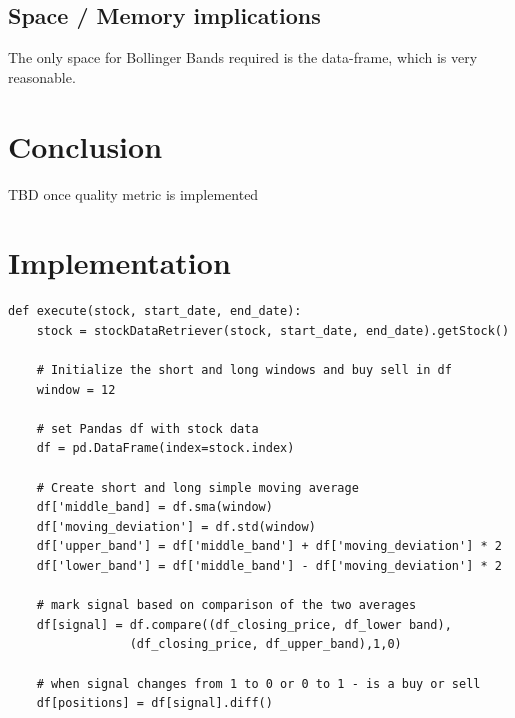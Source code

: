 \documentclass[letterpaper,11pt]{article}
\begin{document}
\subsection*{Space / Memory implications}
The only space for Bollinger Bands required is the data-frame, which is very reasonable.

\section*{Conclusion}
TBD once quality metric is implemented

\section*{Implementation}
\begin{verbatim}
def execute(stock, start_date, end_date):
    stock = stockDataRetriever(stock, start_date, end_date).getStock()

    # Initialize the short and long windows and buy sell in df
    window = 12

    # set Pandas df with stock data
    df = pd.DataFrame(index=stock.index)

    # Create short and long simple moving average
    df['middle_band] = df.sma(window)
    df['moving_deviation'] = df.std(window)
    df['upper_band'] = df['middle_band'] + df['moving_deviation'] * 2
    df['lower_band'] = df['middle_band'] - df['moving_deviation'] * 2

    # mark signal based on comparison of the two averages
    df[signal] = df.compare((df_closing_price, df_lower band), 
    		     (df_closing_price, df_upper_band),1,0)

    # when signal changes from 1 to 0 or 0 to 1 - is a buy or sell
    df[positions] = df[signal].diff()

\end{verbatim}



\end{document}
